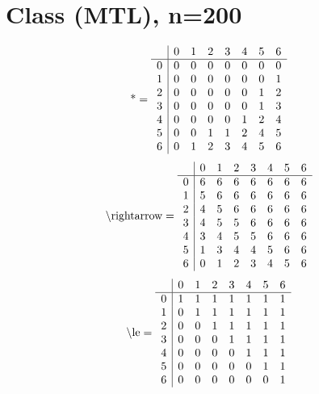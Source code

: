 \documentclass[11pt]{article}
\begin{document}
\section{Class (MTL), n=200}
\[\text{*} = 
\begin{array}{r | r r r r r r r}
 & 0 & 1 & 2 & 3 & 4 & 5 & 6 \\ \hline
0 & 0 & 0 & 0 & 0 & 0 & 0 & 0 \\
1 & 0 & 0 & 0 & 0 & 0 & 0 & 1 \\
2 & 0 & 0 & 0 & 0 & 0 & 1 & 2 \\
3 & 0 & 0 & 0 & 0 & 0 & 1 & 3 \\
4 & 0 & 0 & 0 & 0 & 1 & 2 & 4 \\
5 & 0 & 0 & 1 & 1 & 2 & 4 & 5 \\
6 & 0 & 1 & 2 & 3 & 4 & 5 & 6 \\
\end{array}
\]
\[\text{\textbackslash rightarrow} = 
\begin{array}{r | r r r r r r r}
 & 0 & 1 & 2 & 3 & 4 & 5 & 6 \\ \hline
0 & 6 & 6 & 6 & 6 & 6 & 6 & 6 \\
1 & 5 & 6 & 6 & 6 & 6 & 6 & 6 \\
2 & 4 & 5 & 6 & 6 & 6 & 6 & 6 \\
3 & 4 & 5 & 5 & 6 & 6 & 6 & 6 \\
4 & 3 & 4 & 5 & 5 & 6 & 6 & 6 \\
5 & 1 & 3 & 4 & 4 & 5 & 6 & 6 \\
6 & 0 & 1 & 2 & 3 & 4 & 5 & 6 \\
\end{array}
\]
\[\text{\textbackslash le} = 
\begin{array}{r | r r r r r r r}
 & 0 & 1 & 2 & 3 & 4 & 5 & 6 \\ \hline
0 & 1 & 1 & 1 & 1 & 1 & 1 & 1 \\
1 & 0 & 1 & 1 & 1 & 1 & 1 & 1 \\
2 & 0 & 0 & 1 & 1 & 1 & 1 & 1 \\
3 & 0 & 0 & 0 & 1 & 1 & 1 & 1 \\
4 & 0 & 0 & 0 & 0 & 1 & 1 & 1 \\
5 & 0 & 0 & 0 & 0 & 0 & 1 & 1 \\
6 & 0 & 0 & 0 & 0 & 0 & 0 & 1 \\
\end{array}
\]
\end{document}
